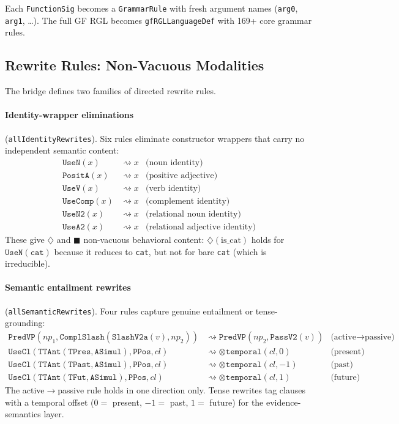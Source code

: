 \documentclass[11pt]{article}
\newcommand{\code}[1]{\texttt{#1}}
\newcommand{\Dia}{\ensuremath{\diamondsuit}}
\newcommand{\Bx}{\ensuremath{\blacksquare}}
\newcommand{\GF}{\textup{GF}}
\newcommand{\RGL}{\textup{RGL}}
\begin{document}
Each \code{FunctionSig} becomes a \code{GrammarRule} with fresh argument
names (\code{arg0}, \code{arg1}, \ldots).  The full \GF{} \RGL{} becomes
\code{gfRGLLanguageDef} with 169+ core grammar rules.

\subsection{Rewrite Rules: Non-Vacuous Modalities}

The bridge defines two families of directed rewrite rules.

\paragraph{Identity-wrapper eliminations} (\code{allIdentityRewrites}).
Six rules eliminate constructor wrappers that carry no independent semantic
content:
\begin{align*}
  \code{UseN}(x) &\rightsquigarrow x & \text{(noun identity)} \\
  \code{PositA}(x) &\rightsquigarrow x & \text{(positive adjective)} \\
  \code{UseV}(x) &\rightsquigarrow x & \text{(verb identity)} \\
  \code{UseComp}(x) &\rightsquigarrow x & \text{(complement identity)} \\
  \code{UseN2}(x) &\rightsquigarrow x & \text{(relational noun identity)} \\
  \code{UseA2}(x) &\rightsquigarrow x & \text{(relational adjective identity)}
\end{align*}
These give $\Dia$ and $\Bx$ non-vacuous behavioral content:
$\Dia(\text{is\_cat})$ holds for $\code{UseN}(\code{cat})$ because it reduces
to \code{cat}, but not for bare \code{cat} (which is irreducible).

\paragraph{Semantic entailment rewrites} (\code{allSemanticRewrites}).
Four rules capture genuine entailment or tense-grounding:
\begin{align*}
  \code{PredVP}(np_1,\code{ComplSlash}(\code{SlashV2a}(v),np_2))
    &\rightsquigarrow \code{PredVP}(np_2,\code{PassV2}(v))
    & \text{(active$\to$passive)} \\
  \code{UseCl}(\code{TTAnt}(\code{TPres},\code{ASimul}),\code{PPos},cl)
    &\rightsquigarrow \mathtt{{\otimes}temporal}(cl,0)
    & \text{(present)} \\
  \code{UseCl}(\code{TTAnt}(\code{TPast},\code{ASimul}),\code{PPos},cl)
    &\rightsquigarrow \mathtt{{\otimes}temporal}(cl,-1)
    & \text{(past)} \\
  \code{UseCl}(\code{TTAnt}(\code{TFut},\code{ASimul}),\code{PPos},cl)
    &\rightsquigarrow \mathtt{{\otimes}temporal}(cl,1)
    & \text{(future)}
\end{align*}
The active$\to$passive rule holds in one direction only.  Tense rewrites tag
clauses with a temporal offset ($0 =$ present, $-1 =$ past, $1 =$ future)
for the evidence-semantics layer.
\end{document}
